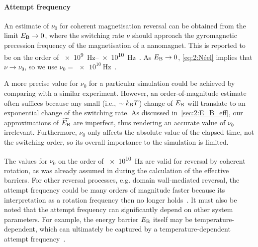 \paragraph{Attempt frequency}
An estimate of $\nu_0$ for coherent magnetisation reversal can be obtained from the limit $E_\mathrm{B} \rightarrow 0$, where the switching rate $\nu$ should approach the gyromagnetic precession frequency of the magnetisation of a nanomagnet.
This is reported to be on the order of \qtyrange{e9}{e10}{\hertz}~\cite{BrownThermalFluctuations,bean1959superparamagnetism}.
As $E_\mathrm{B} \rightarrow 0$, \cref{eq:2:Néel} implies that $\nu \rightarrow \nu_0$, so we use $\nu_0=\qty{e10}{\hertz}$~\cite{JM_Masterproef}. \par %
A more precise value for $\nu_0$ for a particular simulation could be achieved by comparing with a similar experiment.
However, an order-of-magnitude estimate often suffices because any small (i.e., $\sim \kBT$) change of $E_\mathrm{B}$ will translate to an exponential change of the switching rate.
As discussed in~\cref{sec:2:E_B_eff}, our approximations of $\widetilde{E_\mathrm{B}}$ are imperfect, thus rendering an accurate value of $\nu_0$ irrelevant.
Furthermore, $\nu_0$ only affects the absolute value of the elapsed time, not the switching order, so its overall importance to the simulation is limited. \par
The values for $\nu_0$ on the order of \SI{e10}{\hertz} are valid for reversal by coherent rotation, as was already assumed in \hotspice during the calculation of the effective barriers.
For other reversal processes, e.g. domain wall-mediated reversal, the attempt frequency could be many orders of magnitude faster because its interpretation as a rotation frequency then no longer holds~\cite{ArrheniusPrefactor}. %
It must also be noted that the attempt frequency can significantly depend on other system parameters.
For example, the energy barrier $E_\mathrm{B}$ itself may be temperature-dependent, which can ultimately be captured by a temperature-dependent attempt frequency~\cite{AttemptFreqTemperature}. %


